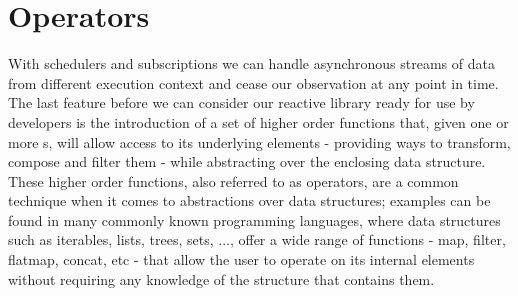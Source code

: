 


\section{Operators}
\label{operators}




With schedulers and subscriptions we can handle asynchronous streams of data from different execution context and cease our observation at any point in time. The last feature before we can consider our reactive library ready for use by developers is the introduction of a set of higher order functions that, given one or more s, will allow access to its underlying elements - providing ways to transform, compose and filter them - while abstracting over the enclosing data structure. These higher order functions, also referred to as operators, are a common technique when it comes to abstractions over data structures; examples can be found in many commonly known programming languages, where data structures such as iterables, lists, trees, sets, ..., offer a wide range of functions - map, filter, flatmap, concat, etc - that allow the user to operate on its internal elements without requiring any knowledge of the structure that contains them.

